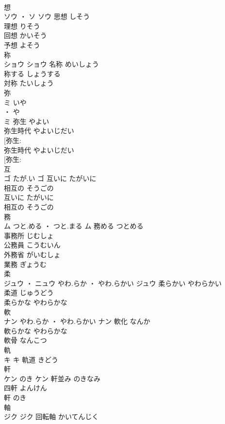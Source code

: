 \documentclass[8pt]{extreport}
\begin{document}
\begin{CJK}{UTF8}{min}
\\	想	
\\	ソウ ・ ソ		ソウ	思想	しそう	
\\	理想	りそう	
\\	回想	かいそう	
\\	予想	よそう	
\\	称	
\\	ショウ		ショウ	名称	めいしょう	
\\	称する	しょうする	
\\	対称	たいしょう	
\\	弥	
\\	ミ	いや
\\	・ や
\\	ミ	弥生	やよい	
\\	弥生時代	やよいじだい	
\\	[弥生: 
\\	弥生時代	やよいじだい	
\\	[弥生: 
\\	互	
\\	ゴ	たが.い	ゴ	互いに	たがいに	
\\	相互の	そうごの	
\\	互いに	たがいに	
\\	相互の	そうごの	
\\	務	
\\	ム	つと.める ・ つと.まる	ム	務める	つとめる	
\\	事務所	じむしょ	
\\	公務員	こうむいん	
\\	外務省	がいむしょ	
\\	業務	ぎょうむ	
\\	柔	
\\	ジュウ ・ ニュウ	やわ.らか ・ やわ.らかい	ジュウ	柔らかい	やわらかい	
\\	柔道	じゅうどう	
\\	柔らかな	やわらかな	
\\	軟	
\\	ナン	やわ.らか ・ やわ.らかい	ナン	軟化	なんか	
\\	軟らかな	やわらかな	
\\	軟骨	なんこつ	
\\	軌	
\\	キ		キ													軌道	きどう	
\\	軒	
\\	ケン	のき	ケン	軒並み	のきなみ	
\\	四軒	よんけん	
\\	軒	のき	
\\	軸	
\\	ジク		ジク	回転軸	かいてんじく	

\end{CJK}
\end{document}
